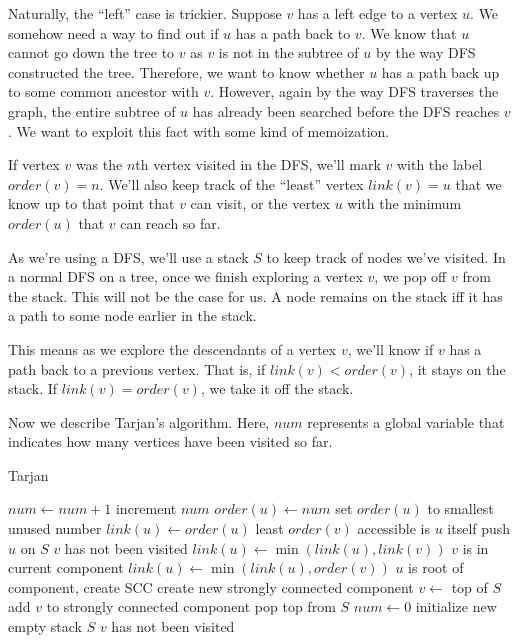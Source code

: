 Naturally, the ``left'' case is trickier. Suppose $v$ has a left edge to a vertex $u$. We somehow need a way to find out if $u$ has a path back to $v$. We know that $u$ cannot go down the tree to $v$ as $v$ is not in the subtree of $u$ by the way DFS constructed the tree. Therefore, we want to know whether $u$ has a path back up to some common ancestor with $v$. However, again by the way DFS traverses the graph, the entire subtree of $u$ has already been searched before the DFS reaches $v$. We want to exploit this fact with some kind of memoization.

If vertex $v$ was the $n$th vertex visited in the DFS, we'll mark $v$ with the label $order(v) = n$. We'll also keep track of the ``least'' vertex $link(v)=u$ that we know up to that point that $v$ can visit, or the vertex $u$ with the minimum $order(u)$ that $v$ can reach so far.

As we're using a DFS, we'll use a stack $S$ to keep track of nodes we've visited. In a normal DFS on a tree, once we finish exploring a vertex $v$, we pop off $v$ from the stack. This will not be the case for us. A node remains on the stack iff it has a path to some node earlier in the stack.

This means as we explore the descendants of a vertex $v$, we'll know if $v$ has a path back to a previous vertex. That is, if $link(v) < order(v)$, it stays on the stack. If $link(v) = order(v)$, we take it off the stack.

Now we describe Tarjan's algorithm. Here, $num$ represents a global variable that indicates how many vertices have been visited so far.

\begin{algorithm}[H]
\caption{Tarjan}
\begin{algorithmic}
	\State $num \gets num + 1$		\Comment increment $num$
	\State $order(u) \gets num$		\Comment set $order(u)$ to smallest unused number
	\State $link(u) \gets order(u)$	\Comment least $order(v)$ accessible is $u$ itself
	\State push $u$ on $S$
			\Comment $v$ has not been visited
			\State {}
			\State $link(u) \gets \min(link(u), link(v))$
				\Comment $v$ is in current component
			\State $link(u) \gets \min(link(u), order(v))$
		\EndIf
	\EndFor
				\Comment $u$ is root of component, create SCC
		\State create new strongly connected component
		\Repeat
			\State $v \gets$ top of $S$
			\State add $v$ to strongly connected component
			\State pop top from $S$
	\EndIf
\EndFunction
{}
	\State $num \gets 0$
	\State initialize new empty stack $S$
			\Comment $v$ has not been visited
			\State {}
		\EndIf
	\EndFor
\EndFunction
\end{algorithmic}
\end{algorithm}

